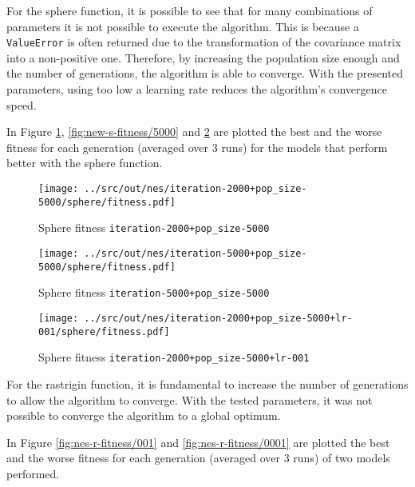 For the sphere function, it is possible to see that for many combinations of parameters it is not possible to execute the algorithm. This is because a \texttt{ValueError} is often returned due to the transformation of the covariance matrix into a non-positive one.
Therefore, by increasing the population size enough and the number of generations, the algorithm is able to converge.
With the presented parameters, using too low a learning rate reduces the algorithm's convergence speed.
\bigskip

In Figure \ref{fig:new-s-fitness/2000}, \ref{fig:new-s-fitness/5000} and \ref{fig:new-s-fitness/lr} are plotted the best and the worse fitness for each generation (averaged over 3 runs) for the models that perform better with the sphere function.

 \begin{figure}[H]
	\centering
	\begin{minipage}[b]{.6\textwidth}
		\texttt{[image: ../src/out/nes/iteration-2000+pop\_size-5000/sphere/fitness.pdf]}	
	\end{minipage}
	\caption{Sphere fitness \texttt{iteration-2000+pop\_size-5000}}
	\label{fig:new-s-fitness/2000}
\end{figure}

\begin{figure}[H]
\centering
	\begin{minipage}[b]{.6\textwidth}
		\texttt{[image: ../src/out/nes/iteration-5000+pop\_size-5000/sphere/fitness.pdf]}	
	\end{minipage}
	\caption{Sphere fitness \texttt{iteration-5000+pop\_size-5000}}
	\label{fig:new-s-fitness/5000}

	\begin{minipage}[b]{.6\textwidth}
		\texttt{[image: ../src/out/nes/iteration-2000+pop\_size-5000+lr-001/sphere/fitness.pdf]}	
	\end{minipage}
	\caption{Sphere fitness \texttt{iteration-2000+pop\_size-5000+lr-001}}
	\label{fig:new-s-fitness/lr}
\end{figure}

For the rastrigin function, it is fundamental to increase the number of generations to allow the algorithm to converge.
With the tested parameters, it was not possible to converge the algorithm to a global optimum.

In Figure \ref{fig:nes-r-fitness/001} and \ref{fig:nes-r-fitness/0001} are plotted the best and the worse fitness for each generation (averaged over 3 runs) of two models performed.

